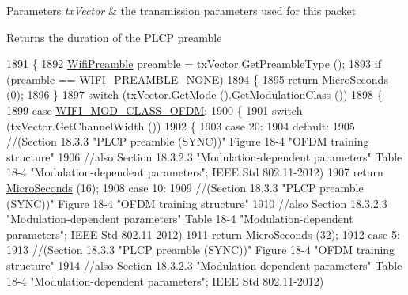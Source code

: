 \begin{DoxyParams}{Parameters}
{\em tx\+Vector} & the transmission parameters used for this packet\\
\hline
\end{DoxyParams}
\begin{DoxyReturn}{Returns}
the duration of the P\+L\+CP preamble 
\end{DoxyReturn}

\begin{DoxyCode}
1891 \{
1892   \hyperlink{group__wifi_ga5e94a56cb338a14ffbbb19c6a41251eb}{WifiPreamble} preamble = txVector.GetPreambleType ();
1893   \textcolor{keywordflow}{if} (preamble == \hyperlink{group__wifi_gga5e94a56cb338a14ffbbb19c6a41251eba97c5c71995de5f28931200e6d5a38a66}{WIFI\_PREAMBLE\_NONE})
1894     \{
1895       \textcolor{keywordflow}{return} \hyperlink{group__timecivil_ga17465a639c8d1464e76538afdd78a9f0}{MicroSeconds} (0);
1896     \}
1897   \textcolor{keywordflow}{switch} (txVector.GetMode ().GetModulationClass ())
1898     \{
1899     \textcolor{keywordflow}{case} \hyperlink{namespacens3_aa999e1221606a2b21b1eb33c2007c217a30a83a0318357c9611f09e6faadc8006}{WIFI\_MOD\_CLASS\_OFDM}:
1900       \{
1901         \textcolor{keywordflow}{switch} (txVector.GetChannelWidth ())
1902           \{
1903           \textcolor{keywordflow}{case} 20:
1904           \textcolor{keywordflow}{default}:
1905             \textcolor{comment}{//(Section 18.3.3 "PLCP preamble (SYNC))" Figure 18-4 "OFDM training structure"}
1906             \textcolor{comment}{//also Section 18.3.2.3 "Modulation-dependent parameters" Table 18-4 "Modulation-dependent
       parameters"; IEEE Std 802.11-2012)}
1907             \textcolor{keywordflow}{return} \hyperlink{group__timecivil_ga17465a639c8d1464e76538afdd78a9f0}{MicroSeconds} (16);
1908           \textcolor{keywordflow}{case} 10:
1909             \textcolor{comment}{//(Section 18.3.3 "PLCP preamble (SYNC))" Figure 18-4 "OFDM training structure"}
1910             \textcolor{comment}{//also Section 18.3.2.3 "Modulation-dependent parameters" Table 18-4 "Modulation-dependent
       parameters"; IEEE Std 802.11-2012)}
1911             \textcolor{keywordflow}{return} \hyperlink{group__timecivil_ga17465a639c8d1464e76538afdd78a9f0}{MicroSeconds} (32);
1912           \textcolor{keywordflow}{case} 5:
1913             \textcolor{comment}{//(Section 18.3.3 "PLCP preamble (SYNC))" Figure 18-4 "OFDM training structure"}
1914             \textcolor{comment}{//also Section 18.3.2.3 "Modulation-dependent parameters" Table 18-4 "Modulation-dependent
       parameters"; IEEE Std 802.11-2012)}

\end{DoxyCode}
